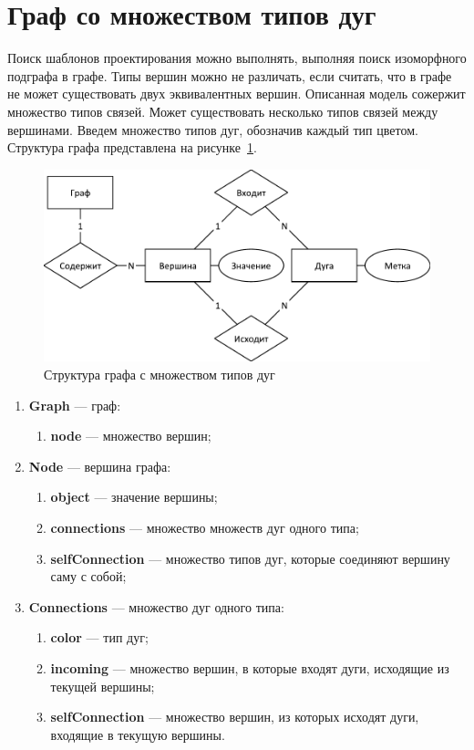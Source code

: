 \section{Граф со множеством типов дуг}

Поиск шаблонов проектирования можно выполнять, выполняя поиск изоморфного подграфа в графе.
Типы вершин можно не различать, если считать, что в графе не может существовать двух эквивалентных вершин.
Описанная модель сожержит множество типов связей.
Может существовать несколько типов связей между вершинами.
Введем множество типов дуг, обозначив каждый тип цветом.
Структура графа представлена на рисунке~\ref{fig:graph}.

\begin{figure}
\centering
\includegraphics[width=\textwidth]{inc/graph.pdf}
\caption{Структура графа с множеством типов дуг}
\label{fig:graph}
\end{figure}

\begin{enumerate}
\item \textbf{Graph} --- граф:
    \begin{enumerate}
    \item \textbf{node} --- множество вершин;
    \end{enumerate}
\item \textbf{Node} --- вершина графа:
    \begin{enumerate}
    \item \textbf{object} --- значение вершины;
    \item \textbf{connections} --- множество множеств дуг одного типа;
    \item \textbf{selfConnection} --- множество типов дуг, которые соединяют вершину саму с собой;
    \end{enumerate}
\item \textbf{Connections} --- множество дуг одного типа:
    \begin{enumerate}
    \item \textbf{color} --- тип дуг;
    \item \textbf{incoming} --- множество вершин, в которые входят дуги, исходящие из текущей вершины;
    \item \textbf{selfConnection} --- множество вершин, из которых исходят дуги, входящие в текущую вершины.
    \end{enumerate}
\end{enumerate}

